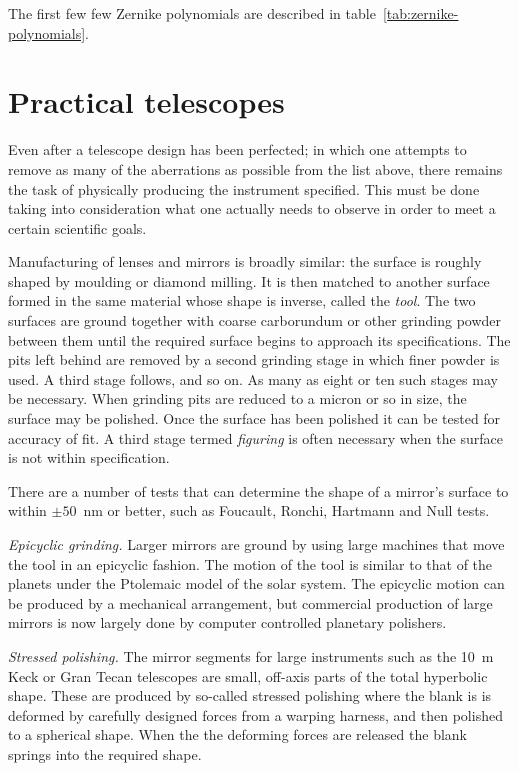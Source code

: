 The first few few Zernike polynomials are described in table~\ref{tab:zernike-polynomials}.

\section{Practical telescopes}

Even after a telescope design has been perfected; in which one attempts to 
remove as many of the aberrations as possible from the list above, there 
remains the task of physically producing the instrument specified. This must
be done taking into consideration what one actually needs to observe in 
order to meet a certain scientific goals. 

Manufacturing of lenses and mirrors is broadly similar: the surface is roughly
shaped by moulding or diamond milling. It is then matched to another surface
formed in the same material whose shape is inverse, called the {\it tool}. 
The two surfaces are ground together with coarse carborundum or other grinding
powder between them until the required surface begins to approach 
its specifications. The pits left behind are removed by a second grinding stage
in which finer powder is used. A third stage follows, and so on. As many as
eight or ten such stages may be necessary. When grinding pits are reduced to
a micron or so in size, the surface may be polished. Once the surface has been
polished it can be tested for accuracy of fit. A third stage termed {\it 
figuring} is often necessary when the surface is not within specification. 

There are a number of tests that can determine the shape of a mirror's surface
to within $\pm 50$~nm or better, such as Foucault, Ronchi, Hartmann and Null
tests. 

\noindent
{\it Epicyclic grinding.} Larger mirrors are ground by using large machines that 
move the tool in an epicyclic fashion. The motion of the tool is similar to that of 
the planets under the Ptolemaic model of the solar system. The epicyclic motion 
can be produced by a mechanical arrangement, but commercial production of 
large mirrors is now largely done by computer controlled planetary polishers. 

\noindent
{\it Stressed polishing.} The mirror segments for large instruments such as the 10~m
Keck or Gran Tecan telescopes are small, off-axis parts of the total hyperbolic shape. 
These are produced by so-called stressed polishing where the blank is is deformed 
by carefully designed forces from a warping harness, and then polished to a spherical
shape. When the the deforming forces are released the blank springs into the required 
shape.

